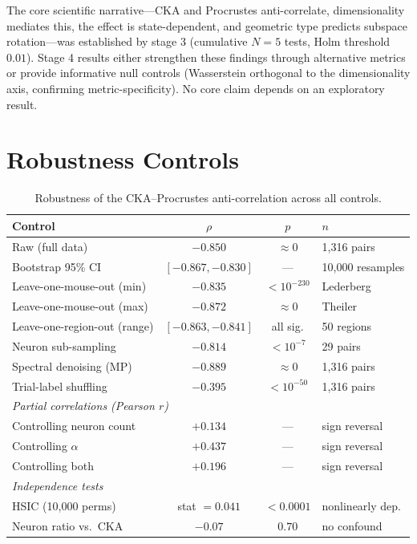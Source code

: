 \documentclass{article}
\begin{document}
The core scientific narrative---CKA and Procrustes anti-correlate, dimensionality mediates this, the effect is state-dependent, and geometric type predicts subspace rotation---was established by stage 3 (cumulative $N = 5$ tests, Holm threshold $0.01$). Stage 4 results either strengthen these findings through alternative metrics or provide informative null controls (Wasserstein orthogonal to the dimensionality axis, confirming metric-specificity). No core claim depends on an exploratory result.

\section{Robustness Controls}
\label{app:robustness}

\begin{table}[h]
\centering
\small
\caption{Robustness of the CKA--Procrustes anti-correlation across all controls.}
\label{tab:robustness}
\begin{tabular}{@{}lccl@{}}
\toprule
\textbf{Control} & \textbf{$\rho$} & \textbf{$p$} & \textbf{$n$} \\
\midrule
Raw (full data) & $-0.850$ & $\approx 0$ & 1,316 pairs \\
Bootstrap 95\% CI & $[-0.867, -0.830]$ & --- & 10,000 resamples \\
Leave-one-mouse-out (min) & $-0.835$ & $< 10^{-230}$ & Lederberg \\
Leave-one-mouse-out (max) & $-0.872$ & $\approx 0$ & Theiler \\
Leave-one-region-out (range) & $[-0.863, -0.841]$ & all sig. & 50 regions \\
Neuron sub-sampling & $-0.814$ & $< 10^{-7}$ & 29 pairs \\
Spectral denoising (MP) & $-0.889$ & $\approx 0$ & 1,316 pairs \\
Trial-label shuffling & $-0.395$ & $< 10^{-50}$ & 1,316 pairs \\
\midrule
\multicolumn{4}{l}{\emph{Partial correlations (Pearson $r$)}} \\
Controlling neuron count & $+0.134$ & --- & sign reversal \\
Controlling $\alpha$ & $+0.437$ & --- & sign reversal \\
Controlling both & $+0.196$ & --- & sign reversal \\
\midrule
\multicolumn{4}{l}{\emph{Independence tests}} \\
HSIC (10,000 perms) & stat $= 0.041$ & $< 0.0001$ & nonlinearly dep. \\
Neuron ratio vs.\ CKA & $-0.07$ & $0.70$ & no confound \\
\bottomrule
\end{tabular}
\end{table}
\end{document}
